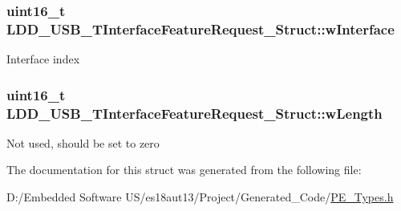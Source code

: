 \subsubsection[{w\+Interface}]{\setlength{\rightskip}{0pt plus 5cm}uint16\+\_\+t L\+D\+D\+\_\+\+U\+S\+B\+\_\+\+T\+Interface\+Feature\+Request\+\_\+\+Struct\+::w\+Interface}\label{struct_l_d_d___u_s_b___t_interface_feature_request___struct_afc1da433b4a02f8c6a6ed6ce8b3065da}
Interface index \hypertarget{struct_l_d_d___u_s_b___t_interface_feature_request___struct_a5f54f1e83024342d9d63aad374a117ba}{}
\subsubsection[{w\+Length}]{\setlength{\rightskip}{0pt plus 5cm}uint16\+\_\+t L\+D\+D\+\_\+\+U\+S\+B\+\_\+\+T\+Interface\+Feature\+Request\+\_\+\+Struct\+::w\+Length}\label{struct_l_d_d___u_s_b___t_interface_feature_request___struct_a5f54f1e83024342d9d63aad374a117ba}
Not used, should be set to zero 

The documentation for this struct was generated from the following file\+:\begin{DoxyCompactItemize}
\item 
D\+:/\+Embedded Software U\+S/es18aut13/\+Project/\+Generated\+\_\+\+Code/\hyperlink{_p_e___types_8h}{P\+E\+\_\+\+Types.\+h}\end{DoxyCompactItemize}
